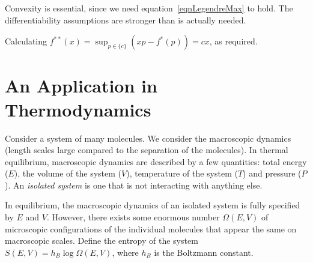 \documentclass[../Main.tex]{subfiles}
\begin{document}
\begin{remark}
    Convexity is essential, since we need equation~\ref{eqnLegendreMax} to hold. The differentiability assumptions are stronger than is actually needed.
\end{remark}
\begin{example}
    Calculating $f^{**}(x) = \sup_{p \in \{c\}} \left(xp - f^*(p)\right) = cx$, as required.
\end{example}
\section{An Application in Thermodynamics}
Consider a system of many molecules. We consider the macroscopic dynamics (length scales large compared to the separation of the molecules). In thermal equilibrium, macroscopic dynamics are described by a few quantities: total energy ($E$), the volume of the system ($V$), temperature of the system ($T$) and pressure ($P$). An \textit{isolated system} is one that is not interacting with anything else.

In equilibrium, the macroscopic dynamics of an isolated system is fully specified by $E$ and $V$. However, there exists some enormous number $\Omega(E, V)$ of microscopic configurations of the individual molecules that appear the same on macroscopic scales. Define the entropy of the system $S(E, V) = h_B \log{\Omega(E, V)}$, where $h_B$ is the Boltzmann constant.
\end{document}
